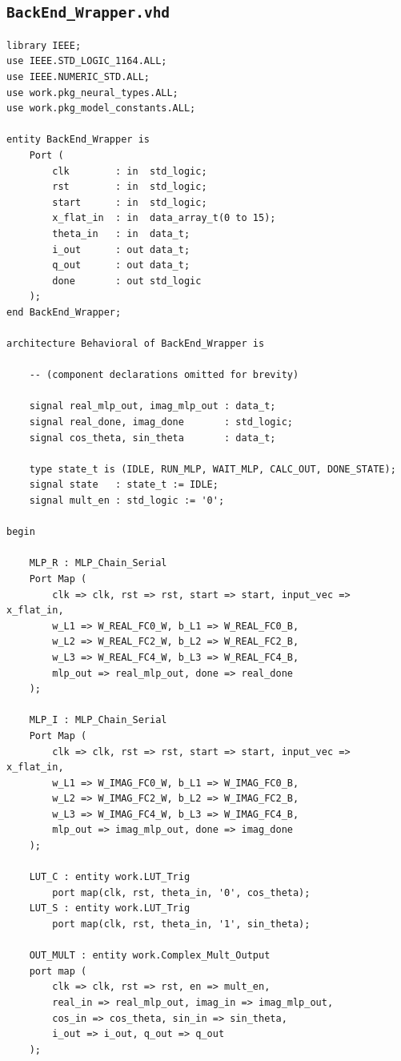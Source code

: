 \documentclass[a4paper,12pt]{article}
\begin{document}
\subsection{\texttt{BackEnd\_Wrapper.vhd}}

\begin{lstlisting}[style=vhdlstyle,
    caption={C\'odigo VHDL do \texttt{BackEnd\_Wrapper}.},
    label={lst:backend}]
library IEEE;
use IEEE.STD_LOGIC_1164.ALL;
use IEEE.NUMERIC_STD.ALL;
use work.pkg_neural_types.ALL;
use work.pkg_model_constants.ALL;

entity BackEnd_Wrapper is
    Port (
        clk        : in  std_logic;
        rst        : in  std_logic;
        start      : in  std_logic;
        x_flat_in  : in  data_array_t(0 to 15);
        theta_in   : in  data_t;
        i_out      : out data_t;
        q_out      : out data_t;
        done       : out std_logic
    );
end BackEnd_Wrapper;

architecture Behavioral of BackEnd_Wrapper is

    -- (component declarations omitted for brevity)

    signal real_mlp_out, imag_mlp_out : data_t;
    signal real_done, imag_done       : std_logic;
    signal cos_theta, sin_theta       : data_t;

    type state_t is (IDLE, RUN_MLP, WAIT_MLP, CALC_OUT, DONE_STATE);
    signal state   : state_t := IDLE;
    signal mult_en : std_logic := '0';

begin

    MLP_R : MLP_Chain_Serial
    Port Map (
        clk => clk, rst => rst, start => start, input_vec => x_flat_in,
        w_L1 => W_REAL_FC0_W, b_L1 => W_REAL_FC0_B,
        w_L2 => W_REAL_FC2_W, b_L2 => W_REAL_FC2_B,
        w_L3 => W_REAL_FC4_W, b_L3 => W_REAL_FC4_B,
        mlp_out => real_mlp_out, done => real_done
    );

    MLP_I : MLP_Chain_Serial
    Port Map (
        clk => clk, rst => rst, start => start, input_vec => x_flat_in,
        w_L1 => W_IMAG_FC0_W, b_L1 => W_IMAG_FC0_B,
        w_L2 => W_IMAG_FC2_W, b_L2 => W_IMAG_FC2_B,
        w_L3 => W_IMAG_FC4_W, b_L3 => W_IMAG_FC4_B,
        mlp_out => imag_mlp_out, done => imag_done
    );

    LUT_C : entity work.LUT_Trig
        port map(clk, rst, theta_in, '0', cos_theta);
    LUT_S : entity work.LUT_Trig
        port map(clk, rst, theta_in, '1', sin_theta);

    OUT_MULT : entity work.Complex_Mult_Output
    port map (
        clk => clk, rst => rst, en => mult_en,
        real_in => real_mlp_out, imag_in => imag_mlp_out,
        cos_in => cos_theta, sin_in => sin_theta,
        i_out => i_out, q_out => q_out
    );


\end{lstlisting}
\end{document}
